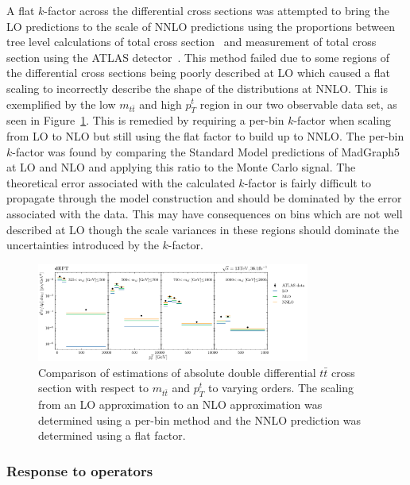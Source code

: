 \documentclass[a4paper,11pt]{article}
\begin{document}
A flat $k$-factor across the differential cross sections was attempted to bring the LO predictions to the scale of NNLO predictions using the proportions between tree level calculations of total cross section~\cite{Alwall_2014} and measurement of total cross section using the ATLAS detector~\cite{ATLAS:2019hxz}.
This method failed due to some regions of the differential cross sections being poorly described at LO which caused a flat scaling to incorrectly describe the shape of the distributions at NNLO.
This is exemplified by the low $m_{t\bar{t}}$ and high $p_{T}^{t}$ region in our two observable data set, as seen in Figure~\ref{fig:kfactor}.
This is remedied by requiring a per-bin $k$-factor when scaling from LO to NLO but still using the flat factor to build up to NNLO.
The per-bin $k$-factor was found by comparing the Standard Model predictions of MadGraph5 at LO and NLO and applying this ratio to the Monte Carlo signal.
The theoretical error associated with the calculated $k$-factor is fairly difficult to propagate through the model construction and should be dominated by the error associated with the data.
This may have consequences on bins which are not well described at LO though the scale variances in these regions should dominate the uncertainties introduced by the $k$-factor.

\begin{figure}[H]
    \centering
    \includegraphics[width=0.8\textwidth]{plots/k_factor.png}
    \caption{Comparison of estimations of absolute double differential $t\bar{t}$ cross section with respect to $m_{t\bar{t}}$ and $p_{T}^{t}$ to varying orders. The scaling from an LO approximation to an NLO approximation was determined using a per-bin method and the NNLO prediction was determined using a flat factor.}
    \label{fig:kfactor}
\end{figure}

\subsubsection{Response to operators}\label{sec:response}
\end{document}
